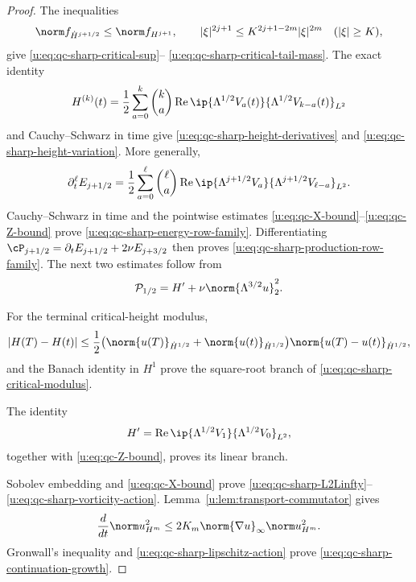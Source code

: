 {\begin{proof}
The inequalities
\[
 \norm f_{\dot H^{j+1/2}}\le\norm f_{H^{j+1}},
 \qquad
 |\xi|^{2j+1}\le K^{2j+1-2m}|\xi|^{2m}
 \quad(|\xi|\ge K),
\]
give \eqref{u:eq:qc-sharp-critical-sup}--%
\eqref{u:eq:qc-sharp-critical-tail-mass}.  The exact identity
\[
 H^{(k)}(t)=\frac12\sum_{a=0}^{k}\binom ka
 \operatorname{Re}\ip{\Lambda^{1/2}V_a(t)}
 {\Lambda^{1/2}V_{k-a}(t)}_{L^2}
\]
and Cauchy--Schwarz in time give
\eqref{u:eq:qc-sharp-height-derivatives} and
\eqref{u:eq:qc-sharp-height-variation}.  More generally,
\[
 \partial_t^\ell E_{j+1/2}
 =\frac12\sum_{a=0}^{\ell}\binom\ell a
 \operatorname{Re}\ip{\Lambda^{j+1/2}V_a}
 {\Lambda^{j+1/2}V_{\ell-a}}_{L^2}.
\]
Cauchy--Schwarz in time and the pointwise estimates
\eqref{u:eq:qc-X-bound}--\eqref{u:eq:qc-Z-bound} prove
\eqref{u:eq:qc-sharp-energy-row-family}.  Differentiating
\(\cP_{j+1/2}=\partial_tE_{j+1/2}+2\nu E_{j+3/2}\)
then proves \eqref{u:eq:qc-sharp-production-row-family}.  The next two
estimates follow from
\[
 \mathcal P_{1/2}=H'+\nu\norm{\Lambda^{3/2}u}_2^2.
\]
\begin{samepage}
For the terminal critical-height modulus,
\[
 |H(T)-H(t)|
 \le\frac12\bigl(
 \norm{u(T)}_{\dot H^{1/2}}+\norm{u(t)}_{\dot H^{1/2}}
 \bigr)\norm{u(T)-u(t)}_{\dot H^{1/2}},
\]
and the Banach identity in \(H^1\) prove the square-root branch of
\eqref{u:eq:qc-sharp-critical-modulus}.
\par
\end{samepage}
The identity
\[
 H'=\operatorname{Re}
 \ip{\Lambda^{1/2}V_1}{\Lambda^{1/2}V_0}_{L^2},
\]
together with \eqref{u:eq:qc-Z-bound}, proves its linear branch.

Sobolev embedding and \eqref{u:eq:qc-X-bound} prove
\eqref{u:eq:qc-sharp-L2Linfty}--\eqref{u:eq:qc-sharp-vorticity-action}.
Lemma~\ref{u:lem:transport-commutator} gives
\[
 \frac d{dt}\norm u_{H^m}^2
 \le2K_m\norm{\nabla u}_\infty\norm u_{H^m}^2.
\]
Gronwall's inequality and \eqref{u:eq:qc-sharp-lipschitz-action} prove
\eqref{u:eq:qc-sharp-continuation-growth}.
\end{proof}
}
